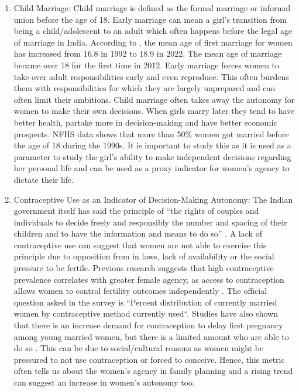 \begin{enumerate}
    \item Child Marriage: Child marriage is defined as the formal marriage or informal union before the age of 18. Early marriage can mean a girl's transition from being a child/adolescent to an adult which often happens before the legal age of marriage in India. According to \cite{globaldata2012}, the mean age of first marriage for women has increased from 16.8 in 1992 to 18.9 in 2022. The mean age of marriage became over 18 for the first time in 2012. Early marriage forces women to take over adult responsibilities early and even reproduce. This often burdens them with responsibilities for which they are largely unprepared and can often limit their ambitions. Child marriage often takes away the autonomy for women to make their own decisions. When girls marry later they tend to have better health, partake more in decision-making and have better economic prospects. NFHS data shows that more than 50\% women got married before the age of 18 during the 1990s. It is important to study this as it is used as a parameter to study the girl's ability to make independent decisions regarding her personal life and can be used as a proxy indicator for women's agency to dictate their life.
    \item  Contraceptive Use as an Indicator of Decision-Making Autonomy: The Indian government itself has said the principle of “the rights of couples and individuals to decide freely and responsibly the number and spacing of their children and to have the information and means to do so”  \citep{pachauri2014priority}. A lack of contraceptive use can suggest that women are not able to exercise this principle due to opposition from in laws, lack of availability or the social pressure to be fertile. Previous research suggests that high contraceptive prevalence correlates with greater female agency, as access to contraception allows women to control fertility outcomes independently \citep{kishor2004women}. The official question asked in the survey is ``Percent distribution of currently married women by contraceptive method currently used``. Studies have also shown that there is an increase demand for contraception to delay first pregnancy among young married women, but there is a limited amount who are able to do so \citep{jejeebhoy2014demand}. This can be due to social/cultural reasons as women might be pressured to not use contraception or forced to conceive. Hence, this metric often tells us about the women's agency in family planning and a rising trend can suggest an increase in women's autonomy too.


\end{enumerate}
